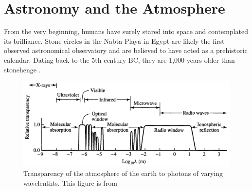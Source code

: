 \section{Astronomy and the Atmosphere}


From the very beginning, humans have surely stared into space and
contemplated its brilliance.  Stone circles in the Nabta Playa in
Egypt are likely the first observed astronomical observatory and
are believed to have acted as a prehistoric calendar.  Dating back
to the 5th century BC, they are 1,000 years older than stonehenge
\citep{mck-mahille_2007_astronomy-nabta}.

\begin{figure}[htbp]
  \centering
  \includegraphics[width=\textwidth]{chapters/introduction/figures/atmospheric_absorption.pdf}
  \caption{
  Transparency of the atmosphere of the earth to photons of 
  varying wavelenthts.  This figure is from \cite{carroll_2006_introduction-modern}
  }
\end{figure}







